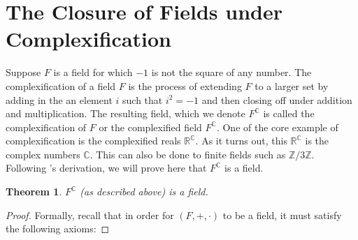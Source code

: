 \documentclass[12pt]{article}
\newcommand{\Z}{\mathbb{Z}}
\newcommand{\R}{\mathbb{R}}
\newcommand{\C}{\mathbb{C}}
\newcommand{\fc}{F^{\C}}
\theoremstyle{plain}
\newtheorem{theorem}{Theorem}[section]
\theoremstyle{definition}
\begin{document}
\begin{appendices}
\begin{center}
\end{center}


\newpage 
\section{The Closure of Fields under Complexification} \label{appendixB}

Suppose $F$ is a field for which $-1$ is not the square of any number. The complexification of a field $F$ is the process of extending $F$ to a larger set by adding in the an element $i$ such that $i^2 = -1$ and then closing off under addition and multiplication. The resulting field, which we denote $F^\C$ is called the complexification of $F$ or the complexified field $F^\C$. One of the core example of complexification is the complexified reals $\R^\C$. As it turns out, this $\R^\C$ is the complex numbers $\C$. This can also be done to finite fields such as $\Z/3\Z$. Following \cite{complexification}'s derivation, we will prove here that $F^\C$ is a field.

\begin{theorem} 
$\fc$ (as described above) is a field.
\end{theorem}

\begin{proof} Formally, recall that in order for $(F,+,\cdot)$ to be a field, it must satisfy the following axioms:


\end{proof}
\end{appendices}
\end{document}
